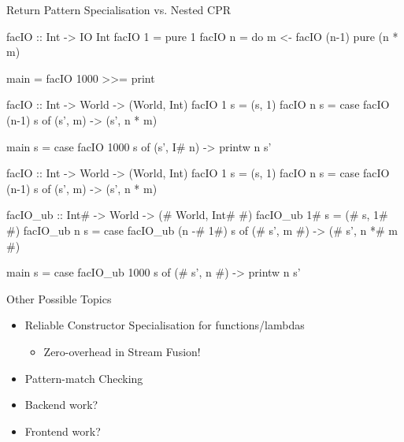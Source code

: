 \documentclass{haskellbeamer}
\begin{document}
\begin{frame}[fragile]{Return Pattern Specialisation vs. Nested CPR}
  \begin{center}
    \begin{overprint}
      \begin{haskell}
        facIO :: Int -> IO Int
        facIO 1 = pure 1
        facIO n = do
          m <- facIO (n-1)
          pure (n * m)

        main = facIO 1000 >>= print
      \end{haskell}
      \begin{haskell}
        facIO :: Int -> World -> (World, Int)
        facIO 1 s = (s, 1)
        facIO n s = case facIO (n-1) s of
          (s', m) -> (s', n * m)


        main s = case facIO 1000 s of
          (s', I# n) -> printw n s'
      \end{haskell}
      \begin{haskell}
        facIO :: Int -> World -> (World, Int)
        facIO 1 s = (s, 1)
        facIO n s = case facIO (n-1) s of
          (s', m) -> (s', n * m)

        facIO_ub :: Int# -> World -> (# World, Int# #)
        facIO_ub 1# s = (# s, 1# #)
        facIO_ub n s = case facIO_ub (n -# 1#) s of
          (# s', m #) -> (# s', n *# m #)

        main s = case facIO_ub 1000 s of
          (# s', n #) -> printw n s'
      \end{haskell}
    \end{overprint}
  \end{center}
\end{frame}

\begin{frame}[fragile]{Other Possible Topics}
  \begin{itemize}
    \item Reliable Constructor Specialisation for functions/lambdas
      \begin{itemize}
        \item Zero-overhead  in Stream Fusion!
      \end{itemize}
    \item Pattern-match Checking
    \item Backend work?
    \item Frontend work?
  \end{itemize}
\end{frame}
\end{document}
